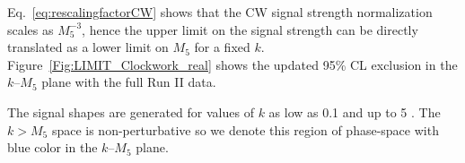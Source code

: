 Eq.~\ref{eq:rescalingfactorCW} shows that the CW signal strength normalization scales as  $M_5^{-3}$, hence the upper limit on the signal strength can be directly translated as a lower limit on $M_5$ for a fixed $k$.  Figure~\ref{Fig:LIMIT_Clockwork_real} shows the updated 95\% CL exclusion in the $k$--$M_5$ plane with the full Run II data.

The signal shapes are generated for values of $k$ as low as 0.1 \GeV and up to 5 \TeV. The $k>M_5$ space is non-perturbative so we denote this region of phase-space with blue color in the $k$--$M_5$ plane.


